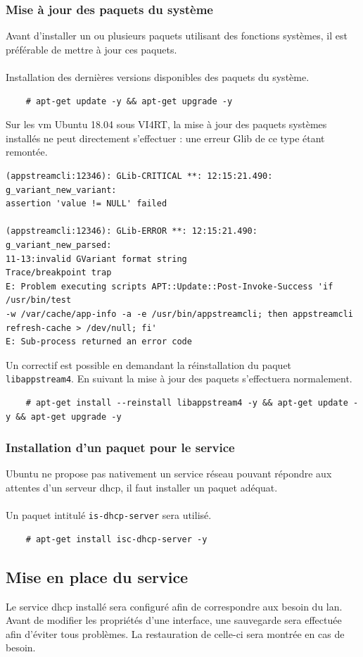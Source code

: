 \documentclass[a4paper]{article}
\begin{document}
\subsubsection{Mise à jour des paquets du système}
Avant d'installer un ou plusieurs paquets utilisant des fonctions systèmes, il est préférable de mettre à jour ces paquets.\\\\Installation des dernières versions disponibles des paquets du système.
\begin{lstlisting}
    # apt-get update -y && apt-get upgrade -y
\end{lstlisting}
Sur les \acrshort{vm} Ubuntu 18.04 sous VI4RT, la mise à jour des paquets systèmes installés ne peut directement s'effectuer : une erreur Glib de ce type étant remontée.
\begin{lstlisting}
(appstreamcli:12346): GLib-CRITICAL **: 12:15:21.490: g_variant_new_variant: 
assertion 'value != NULL' failed

(appstreamcli:12346): GLib-ERROR **: 12:15:21.490: g_variant_new_parsed: 
11-13:invalid GVariant format string
Trace/breakpoint trap
E: Problem executing scripts APT::Update::Post-Invoke-Success 'if /usr/bin/test 
-w /var/cache/app-info -a -e /usr/bin/appstreamcli; then appstreamcli 
refresh-cache > /dev/null; fi'
E: Sub-process returned an error code
\end{lstlisting}
Un correctif est possible en demandant la réinstallation du paquet \verb|libappstream4|. En suivant la mise à jour des paquets s'effectuera normalement.
\begin{lstlisting}
    # apt-get install --reinstall libappstream4 -y && apt-get update -y && apt-get upgrade -y
\end{lstlisting}
\subsubsection{Installation d'un paquet pour le service}
Ubuntu ne propose pas nativement un service réseau pouvant répondre aux attentes d'un serveur \gls{dhcp}, il faut installer un paquet adéquat.\\\\Un paquet intitulé \verb|is-dhcp-server| sera utilisé.
\begin{lstlisting}
    # apt-get install isc-dhcp-server -y
\end{lstlisting}
\subsection{Mise en place du service}
Le service \gls{dhcp} installé sera configuré afin de correspondre aux besoin du \gls{lan}.\\Avant de modifier les propriétés d'une interface, une sauvegarde sera effectuée afin d'éviter tous problèmes. La restauration de celle-ci sera montrée en cas de besoin.
\end{document}
